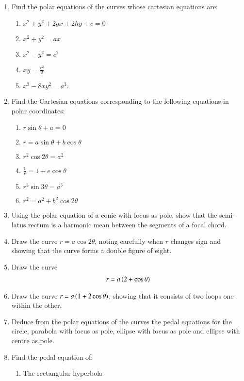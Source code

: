 \renewcommand{\theequation}{\theenumi}
\begin{enumerate}[label=\arabic*.,ref=\thesubsection.\theenumi]
\item Find the polar equations of the curves whose cartesian equations are:
\begin{enumerate}
\item 
$
x^2+y^2+2gx+2hy+c = 0
$
\item 
$
x^2+y^2 = ax
$
\item 
$
x^2-y^2=c^2
$
\item 
$
xy = \frac{c^2}{2}
$
\item 
$
x^3-8xy^2 = a^3.
$

\end{enumerate}
\item Find the Cartesian equations corresponding to the following
equations in polar coordinates:
\begin{enumerate}
\item 
$
r\sin\theta + a = 0
$
\item 
$
r = a\sin\theta + b\cos\theta
$
\item 
$
r^2\cos2\theta = a^2
$
\item 
$
\frac{1}{r} = 1 + e\cos\theta
$
\item 
$
r^3\sin3\theta = a^3
$
\item 
$
r^2=a^2+b^2\cos2\theta
$
\end{enumerate}
\item Using the polar equation of a conic with focus as pole, show that
the semi-latus rectum is a harmonic mean between the segments of
a focal chord.
\item Draw the curve $r=a\cos2\theta$, noting carefully when $r$
changes sign and showing that the curve forms a double figure of eight.
\item Draw the curve
\begin{align*}
r = a\left(2+\cos\theta\right)
\end{align*}
\item Draw the curve $r = a\left(1+2\cos\theta\right)$, showing that it consists of two loops one within
the other.
\item Deduce from the polar equations of the curves the pedal equations for
the circle, parabola with focus as pole, ellipse with focus as pole and
ellipse with centre as pole.
\item Find the pedal equation of:
\begin{enumerate}
\item The rectangular hyperbola

\end{enumerate}
\end{enumerate}
